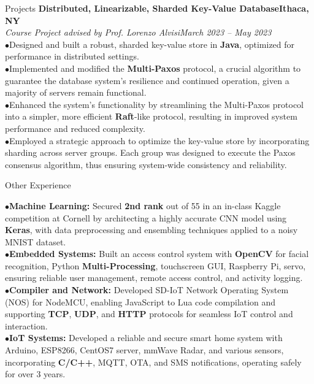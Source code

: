 \documentclass{resume} %
\begin{document}
\begin{rSection}{Projects}
{\bf Distributed, Linearizable, Sharded Key-Value Database}\hfill{\textbf{Ithaca, NY}}
\\{\em Course Project advised by Prof. Lorenzo Alvisi}\hfill {\em March 2023 -- May 2023}
\\ $ \bullet $Designed and built a robust, sharded key-value store in \textbf{Java}, optimized for performance in distributed settings.
\\ $ \bullet $Implemented and modified the \textbf{Multi-Paxos} protocol, a crucial algorithm to guarantee the database system's resilience and continued operation, given a majority of servers remain functional.
\\ $ \bullet $Enhanced the system's functionality by streamlining the Multi-Paxos protocol into a simpler, more efficient \textbf{Raft}-like protocol, resulting in improved system performance and reduced complexity.
\\ $ \bullet $Employed a strategic approach to optimize the key-value store by incorporating sharding across server groups. Each group was designed to execute the Paxos consensus algorithm, thus ensuring system-wide consistency and reliability.

\end{rSection}

\begin{rSection}{Other Experience}

$ \bullet $\textbf{Machine Learning:} Secured \textbf{2nd rank} out of 55 in an in-class Kaggle competition at Cornell by architecting a highly accurate CNN model using \textbf{Keras}, with data preprocessing and ensembling techniques applied to a noisy MNIST dataset.
\\ $ \bullet $\textbf{Embedded Systems:} Built an access control system with \textbf{OpenCV} for facial recognition, Python \textbf{Multi-Processing}, touchscreen GUI, Raspberry Pi, servo, ensuring reliable user management, remote access control, and activity logging.
\\ $ \bullet $\textbf{Compiler and Network:} Developed SD-IoT Network Operating System (NOS) for NodeMCU, enabling JavaScript to Lua code compilation and supporting \textbf{TCP}, \textbf{UDP}, and \textbf{HTTP} protocols for seamless IoT control and interaction.
\\ $ \bullet $\textbf{IoT Systems:} Developed a reliable and secure smart home system with Arduino, ESP8266, CentOS7 server, mmWave Radar, and various sensors, incorporating \textbf{C/C++}, MQTT, OTA, and SMS notifications, operating safely for over 3 years.


\end{rSection}

\newpage
\end{document}
